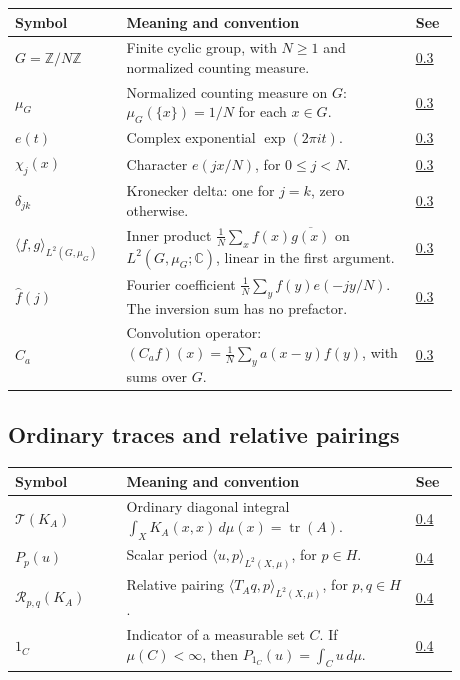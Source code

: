 \begin{longtable}{p{0.22\linewidth}p{0.58\linewidth}p{0.08\linewidth}}
\textbf{Symbol} & \textbf{Meaning and convention} & \textbf{See} \\ \hline
\(G=\mathbb Z/N\mathbb Z\) & Finite cyclic group, with \(N\geq1\) and normalized counting measure. & \hyperref[finite-circle-frequencies]{0.3} \\
$\mu_G$ & Normalized counting measure on $G$: $\mu_G(\{x\})=1/N$ for each $x\in G$. & \hyperref[finite-circle-frequencies]{0.3} \\
\(e(t)\) & Complex exponential \(\exp(2\pi i t)\). & \hyperref[finite-circle-frequencies]{0.3} \\
\(\chi_j(x)\) & Character \(e(jx/N)\), for \(0\leq j<N\). & \hyperref[finite-circle-frequencies]{0.3} \\
\(\delta_{jk}\) & Kronecker delta: one for \(j=k\), zero otherwise. & \hyperref[finite-circle-frequencies]{0.3} \\
$\langle f,g\rangle_{L^2(G,\mu_G)}$ & Inner product $\frac1N\sum_x f(x)\overline{g(x)}$ on $L^2(G,\mu_G;\mathbb C)$, linear in the first argument. & \hyperref[finite-circle-frequencies]{0.3} \\
\(\widehat f(j)\) & Fourier coefficient \(\frac1N\sum_y f(y)e(-jy/N)\). The inversion sum has no prefactor. & \hyperref[finite-fourier-coefficients]{0.3} \\
\(C_a\) & Convolution operator: \((C_a f)(x)=\frac1N\sum_y a(x-y)f(y)\), with sums over \(G\). & \hyperref[finite-convolution-operator]{0.3} \\
\end{longtable}

\subsection*{Ordinary traces and relative pairings}\label{v1a-notation-pairings}

\begin{longtable}{p{0.22\linewidth}p{0.58\linewidth}p{0.08\linewidth}}
\textbf{Symbol} & \textbf{Meaning and convention} & \textbf{See} \\ \hline
\(\mathcal T(K_A)\) & Ordinary diagonal integral \(\int_X K_A(x,x)\,d\mu(x)=\operatorname{tr}(A)\). & \hyperref[ordinary-finite-trace]{0.4} \\
$P_p(u)$ & Scalar period $\langle u,p\rangle_{L^2(X,\mu)}$, for $p\in H$. & \hyperref[relative-finite-pairing]{0.4} \\
$\mathcal R_{p,q}(K_A)$ & Relative pairing $\langle T_Aq,p\rangle_{L^2(X,\mu)}$, for $p,q\in H$. & \hyperref[relative-finite-pairing]{0.4} \\
\(1_C\) & Indicator of a measurable set \(C\). If \(\mu(C)<\infty\), then \(P_{1_C}(u)=\int_Cu\,d\mu\). & \hyperref[finite-subset-periods]{0.4} \\
\end{longtable}


